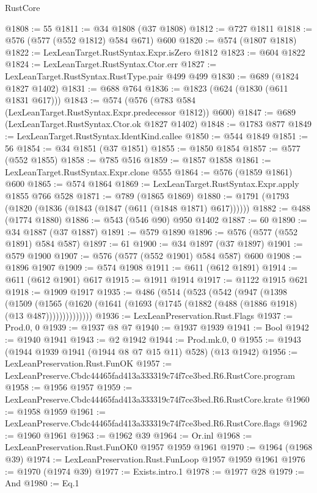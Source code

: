 \begin{lexlean}{RustCore}
\begin{coremodule}
@1808 := 55
@1811 := @34 @1808 (@37 @1808)
@1812 := @727 @1811
@1818 := @576 (@577 (@552 @1812) @584 @671) @600
@1820 := @574 (@1807 @1818)
@1822 := LexLeanTarget.RustSyntax.Expr.isZero @1812
@1823 := @604 @1822
@1824 := LexLeanTarget.RustSyntax.Ctor.err
@1827 := LexLeanTarget.RustSyntax.RustType.pair @499 @499
@1830 := @689 (@1824 @1827 @1402)
@1831 := @688 @764
@1836 := @1823 (@624 (@1830 (@611 @1831 @617)))
@1843 := @574 (@576 (@783 @584 (LexLeanTarget.RustSyntax.Expr.predecessor @1812)) @600)
@1847 := @689 (LexLeanTarget.RustSyntax.Ctor.ok @1827 @1402)
@1848 := @1783 @877
@1849 := LexLeanTarget.RustSyntax.IdentKind.callee
@1850 := @544 @1849
@1851 := 56
@1854 := @34 @1851 (@37 @1851)
@1855 := @1850 @1854
@1857 := @577 (@552 @1855)
@1858 := @785 @516
@1859 := @1857 @1858
@1861 := LexLeanTarget.RustSyntax.Expr.clone @555
@1864 := @576 (@1859 @1861) @600
@1865 := @574 @1864
@1869 := LexLeanTarget.RustSyntax.Expr.apply @1855 @766 @528
@1871 := @789 (@1865 @1869)
@1880 := @1791 (@1793 (@1820 (@1836 (@1843 (@1847 (@611 (@1848 @1871) @617))))))
@1882 := @488 (@1774 @1880)
@1886 := @543 (@546 @90) @950 @1402
@1887 := 60
@1890 := @34 @1887 (@37 @1887)
@1891 := @579 @1890
@1896 := @576 (@577 (@552 @1891) @584 @587)
@1897 := 61
@1900 := @34 @1897 (@37 @1897)
@1901 := @579 @1900
@1907 := @576 (@577 (@552 @1901) @584 @587) @600
@1908 := @1896 @1907
@1909 := @574 @1908
@1911 := @611 (@612 @1891)
@1914 := @611 (@612 @1901) @617
@1915 := @1911 @1914
@1917 := @1122 @1915 @621
@1918 := @1909 @1917
@1935 := @486
    (@514
      (@523
        (@542
          (@947
            (@1398
              (@1509
                (@1565
                  (@1620 (@1641 (@1693 (@1745 (@1882 (@488 (@1886 @1918) (@13 @487))))))))))))))
@1936 := LexLeanPreservation.Rust.Flags
@1937 := Prod.{0, 0}
@1939 := @1937 @8 @7
@1940 := @1937 @1939
@1941 := Bool
@1942 := @1940 @1941
@1943 := @2 @1942
@1944 := Prod.mk.{0, 0}
@1955 := @1943 (@1944 @1939 @1941 (@1944 @8 @7 @15 @11) @528) (@13 @1942)
@1956 := LexLeanPreservation.Rust.FunOK
@1957 := LexLeanPreserve.Cbdc44465fad413a333319c74f7ce3bed.R6.RustCore.program
@1958 := @1956 @1957
@1959 := LexLeanPreserve.Cbdc44465fad413a333319c74f7ce3bed.R6.RustCore.krate
@1960 := @1958 @1959
@1961 := LexLeanPreserve.Cbdc44465fad413a333319c74f7ce3bed.R6.RustCore.flags
@1962 := @1960 @1961
@1963 := @1962 @39
@1964 := Or.inl
@1968 := LexLeanPreservation.Rust.FunOK0 @1957 @1959 @1961
@1970 := @1964 (@1968 @39)
@1974 := LexLeanPreservation.Rust.FunLoop @1957 @1959 @1961
@1976 := @1970 (@1974 @39)
@1977 := Exists.intro.{1}
@1978 := @1977 @28
@1979 := And
@1980 := Eq.{1}

\end{coremodule}
\end{lexlean}
